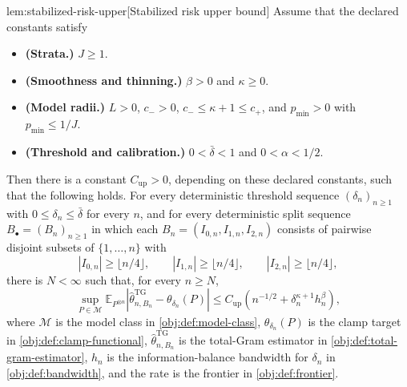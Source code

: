\documentclass[11pt]{article}
\begin{document}
\begin{lemmav}{lem:stabilized-risk-upper}[Stabilized risk upper bound]
Assume that the declared constants satisfy
\begin{itemize}
\item \textbf{(Strata.)} \(J\geq 1\).
\item \textbf{(Smoothness and thinning.)} \(\beta>0\) and \(\kappa\geq 0\).
\item \textbf{(Model radii.)} \(L>0\), \(c_->0\), \(c_-\leq \kappa+1\leq c_+\), and \(p_{\min}>0\) with \(p_{\min}\leq 1/J\).
\item \textbf{(Threshold and calibration.)} \(0<\bar\delta<1\) and \(0<\alpha<1/2\).
\end{itemize}
Then there is a constant \(C_{\mathrm{up}}>0\), depending on these declared constants, such that the following holds.  For every deterministic threshold sequence \((\delta_n)_{n\geq 1}\) with \(0\leq \delta_n\leq \bar\delta\) for every \(n\), and for every deterministic split sequence \(B_{\bullet}=(B_n)_{n\geq 1}\) in which each \(B_n=(I_{0,n},I_{1,n},I_{2,n})\) consists of pairwise disjoint subsets of \(\{1,\ldots,n\}\) with
\[
|I_{0,n}|\geq \lfloor n/4\rfloor,\qquad
|I_{1,n}|\geq \lfloor n/4\rfloor,\qquad
|I_{2,n}|\geq \lfloor n/4\rfloor,
\]
there is \(N<\infty\) such that, for every \(n\geq N\),
\[
\sup_{P\in\mathcal M}
\mathbb E_{P^{\otimes n}}
\left|\widehat\theta^{\mathrm{TG}}_{n,B_n}-\theta_{\delta_n}(P)\right|
\leq
C_{\mathrm{up}}\left(n^{-1/2}+\delta_n^{\kappa+1}h_n^\beta\right),
\]
where \(\mathcal M\) is the model class in \cref{obj:def:model-class}, \(\theta_{\delta_n}(P)\) is the clamp target in \cref{obj:def:clamp-functional}, \(\widehat\theta^{\mathrm{TG}}_{n,B_n}\) is the total-Gram estimator in \cref{obj:def:total-gram-estimator}, \(h_n\) is the information-balance bandwidth for \(\delta_n\) in \cref{obj:def:bandwidth}, and the rate is the frontier in \cref{obj:def:frontier}.
\end{lemmav}
\end{document}
